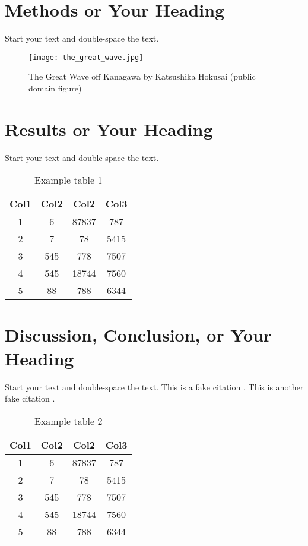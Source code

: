 \documentclass[debug, font=Times]{gw-dissertation}[2021/11/19]
\begin{document}
\chapter{Methods or Your Heading}

Start your text and double-space the text.
\begin{figure}[h!]
    \centering
    \texttt{[image: the\_great\_wave.jpg]}
    \caption{The Great Wave off Kanagawa by Katsushika Hokusai (public domain figure)}
\end{figure}

\chapter{Results or Your Heading}

Start your text and double-space the text.
\begin{table}[h!]
    \centering
    \begin{tabular}{||c c c c||}
         \hline
         Col1 & Col2 & Col2 & Col3 \\ [0.5ex]
         \hline\hline
         1 & 6 & 87837 & 787 \\
         2 & 7 & 78 & 5415 \\
         3 & 545 & 778 & 7507 \\
         4 & 545 & 18744 & 7560 \\
         5 & 88 & 788 & 6344 \\ [1ex]
         \hline
    \end{tabular}
    \caption{Example table 1}
\end{table}

\chapter{Discussion, Conclusion, or Your Heading}

Start your text and double-space the text. This is a fake citation \cite{author1_1990}. This is
another fake citation \cite{author2_2000}.
\begin{table}[h!]
    \centering
    \begin{tabular}{||c c c c||}
         \hline
         Col1 & Col2 & Col2 & Col3 \\ [0.5ex]
         \hline\hline
         1 & 6 & 87837 & 787 \\
         2 & 7 & 78 & 5415 \\
         3 & 545 & 778 & 7507 \\
         4 & 545 & 18744 & 7560 \\
         5 & 88 & 788 & 6344 \\ [1ex]
         \hline
    \end{tabular}
    \caption{Example table 2}
\end{table}
\end{document}
